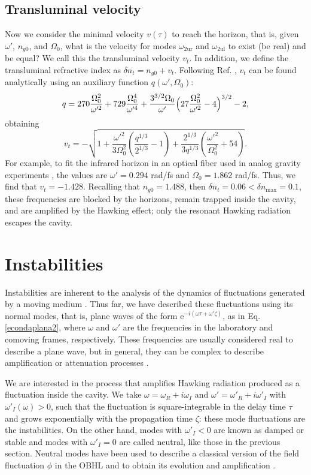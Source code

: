 \documentclass[aps,pra,reprint,amsmath,amssymb,showpacs,groupedaddress,floatfix]{revtex4-1}
\begin{document}
\subsection{Transluminal velocity}
Now we consider the minimal velocity $v(\tau)$ to reach the horizon, that is, given $\omega'$, $n_{g0}$, and $\Omega_0$, what is the velocity for modes $\omega_\text{2ur}$ and $\omega_\text{2ul}$ to exist (be real) and be equal? We call this the transluminal velocity $v_{t}$. In addition, we define the transluminal refractive index as $\delta n_{t}=n_{g0}+v_{t}$. Following Ref. \cite{2018Bermudez}, $v_t$ can be found analytically using an auxiliary function $q(\omega',\Omega_0)$:
\begin{equation}
q=270\frac{\Omega_0^2}{\omega'^2}+729\frac{\Omega_0^4}{\omega'^4}+\frac{3^{3/2}\Omega_0}{\omega'}\Bigl(27\frac{\Omega_0^2}{\omega'^2}-4\Bigr)^{3/2}-2,
\end{equation}
obtaining
\begin{equation}
v_{t}=- \sqrt{1+\frac{\omega'^2}{3\Omega_0^2}\left(\frac{q^{1/3}}{2^{1/3}}-1\right)
	+\frac{2^{1/3}}{3q^{1/3}}\left(\frac{\omega'^2}{\Omega^2_0}+54\right)}.
\end{equation}
For example, to fit the infrared horizon in an optical fiber used in analog gravity experiments \cite{drori2019observation}, the values are $\omega'=0.294$ rad/fs and $\Omega_0=1.862$ rad/fs. Thus, we find that $v_{t}=-1.428$. Recalling that $n_{g0}=1.488$, then $\delta n_t=0.06<\delta n_\text{max}=0.1$, these frequencies are blocked by the horizons, remain trapped inside the cavity, and are amplified by the Hawking effect; only the resonant Hawking radiation escapes the cavity.

\section{Instabilities}\label{sec4insta}
Instabilities are inherent to the analysis of the dynamics of fluctuations generated by a moving medium \cite{Leonhardt2003}. Thus far, we have described these fluctuations using its normal modes, that is, plane waves of the form $\text{e}^{-i(\omega \tau+\omega' \zeta)}$, as in Eq. \eqref{econdaplana2}, where $\omega$ and $\omega'$ are the frequencies in the laboratory and comoving frames, respectively. These frequencies are usually considered real to describe a plane wave, but in general, they can be complex to describe amplification or attenuation processes \cite{Hydrodynamic}.

We are interested in the process that amplifies Hawking radiation produced as a fluctuation inside the cavity. We take $\omega=\omega_R+i\omega_I$ and $\omega'=\omega'_R+i\omega'_I$ with $\omega'_I(\omega)>0$, such that the fluctuation is square-integrable in the delay time $\tau$ and grows exponentially with the propagation time $\zeta$: these mode fluctuations are the instabilities. On the other hand, modes with $\omega'_I<0$ are known as damped or stable \cite{gallaire2017fluid} and modes with $\omega'_I=0$ are called neutral, like those in the previous section. Neutral modes have been used to describe a classical version of the field fluctuation $\phi$ in the OBHL and to obtain its evolution and amplification \cite{Faccio2012,GaonaReyes2017}.
\end{document}
